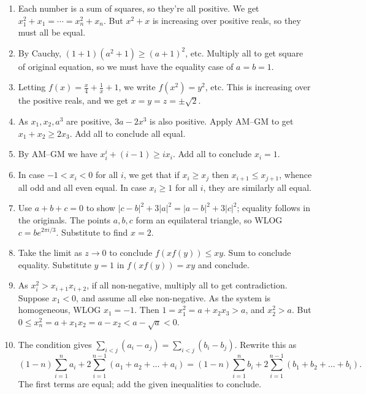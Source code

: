 \documentclass[11pt,paper=letter]{scrartcl}
\begin{document}
\begin{enumerate}

\item Each number is a sum of squares, so they're all positive. We get $x_1^2 + x_1 = \cdots = x_n^2 + x_n$. But $x^2 + x$ is increasing over positive reals, so they must all be equal.

\item By Cauchy, $ (1 + 1)(a^2 + 1) \ge (a + 1)^2 $, etc. Multiply all to get square of original equation, so we must have the equality case of $a = b = 1$.

\item Letting $f(x) = \frac x4 + \frac 1x + 1$, we write $f(x^2) = y^2$, etc. This is increasing over the positive reals, and we get $x = y = z = \pm\sqrt2$.

\item As $x_1, x_2, a^3$ are positive, $3a - 2x^3$ is also positive. Apply AM--GM to get $x_1 + x_2 \ge 2x_3$. Add all to conclude all equal.

\item By AM--GM we have $x_i^i + (i - 1) \ge ix_i$. Add all to conclude $x_i = 1$.

\item In case $-1 < x_i < 0$ for all $i$, we get that if $x_i \ge x_j$ then $x_{i+1} \le x_{j+1}$, whence all odd and all even equal. In case $x_i \ge 1$ for all $i$, they are similarly all equal.

\item Use $a + b + c = 0$ to show $|c - b|^2 + 3|a|^2 = |a - b|^2 + 3|c|^2$; equality follows in the originals. The points $a, b, c$ form an equilateral triangle, so WLOG $c = be^{2\pi i/3}$. Substitute to find $x = 2$.

\item Take the limit as $z \to 0$ to conclude $f(xf(y)) \le xy$. Sum to conclude equality. Substitute $y = 1$ in $f(xf(y)) = xy$ and conclude.

\item As $x_i^2 > x_{i+1}x_{i+2}$, if all non-negative, multiply all to get contradiction. Suppose $x_1 < 0$, and assume all else non-negative. As the system is homogeneous, WLOG $x_1 = -1$. Then $1 = x_1^2 = a + x_2x_3 > a$, and $x_2^2 > a$. But $0 \le x_n^2 = a + x_1x_2 = a - x_2 < a - \sqrt a < 0$.

\item The condition gives $\sum_{i < j} (a_i - a_j) = \sum_{i < j} (b_i - b_j)$. Rewrite this as
$$(1-n)\sum_{i=1}^n a_i + 2\sum_{i=1}^{n-1}(a_1+a_2+\dots+a_i) = (1-n)\sum_{i=1}^n b_i + 2\sum_{i=1}^{n-1}(b_1+b_2+\dots+b_i).$$
The first terms are equal; add the given inequalities to conclude.

\end{enumerate}
\end{document}
